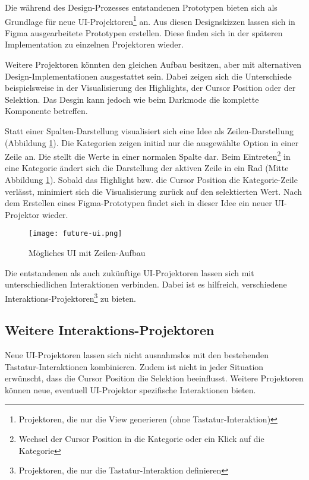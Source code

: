 Die während des Design-Prozesses entstandenen Prototypen bieten sich als Grundlage für neue UI-Projektoren\footnote{
    Projektoren, die nur die View generieren (ohne Tastatur-Interaktion)
} an. 
Aus diesen Designskizzen lassen sich in Figma ausgearbeitete Prototypen erstellen. 
Diese finden sich in der späteren Implementation zu einzelnen Projektoren wieder. 

Weitere Projektoren könnten den gleichen Aufbau besitzen, aber mit alternativen Design-Implementationen ausgestattet sein. 
Dabei zeigen sich die Unterschiede beispielsweise in der Visualisierung des Highlights, der Cursor Position oder der Selektion. 
Das Desgin kann jedoch wie beim Darkmode die komplette Komponente betreffen. 

Statt einer Spalten-Darstellung visualisiert sich eine Idee als Zeilen-Darstellung (Abbildung \ref{img:futureUi}). 
Die Kategorien zeigen initial nur die ausgewählte Option in einer Zeile an. 
Die  stellt die Werte in einer normalen Spalte dar. 
Beim Eintreten\footnote{
    Wechsel der Cursor Position in die Kategorie oder ein Klick auf die Kategorie
} in eine Kategorie ändert sich die Darstellung der aktiven Zeile in ein Rad (Mitte Abbildung \ref{img:futureUi}). 
Sobald das Highlight bzw. die Cursor Position die Kategorie-Zeile verlässt, minimiert sich die Visualisierung zurück auf den selektierten Wert. 
Nach dem Erstellen eines Figma-Prototypen findet sich in dieser Idee ein neuer UI-Projektor wieder. 

\begin{figure}[!htb]
    \centering
    \texttt{[image: future-ui.png]}
    \caption{\centering Mögliches UI mit Zeilen-Aufbau}
    \label{img:futureUi}
\end{figure}

Die entstandenen als auch zukünftige UI-Projektoren lassen sich mit unterschiedlichen Interaktionen verbinden. 
Dabei ist es hilfreich, verschiedene Interaktions-Projektoren\footnote{
    Projektoren, die nur die Tastatur-Interaktion definieren
} zu bieten. 


\subsection{Weitere Interaktions-Projektoren}
\label{sec:moreInteraction}

Neue UI-Projektoren lassen sich nicht ausnahmslos mit den bestehenden Tastatur-Inter\-aktionen kombinieren. 
Zudem ist nicht in jeder Situation erwünscht, dass die Cursor Position die Selektion beeinflusst. 
Weitere Projektoren können neue, eventuell UI-Projektor spezifische Interaktionen bieten. 

